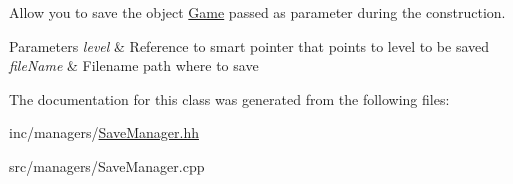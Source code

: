 Allow you to save the object \hyperlink{classGame}{Game} passed as parameter during the construction. 


\begin{DoxyParams}{Parameters}
{\em level} & Reference to smart pointer that points to level to be saved \\
\hline
{\em file\+Name} & Filename path where to save \\
\hline
\end{DoxyParams}


The documentation for this class was generated from the following files\+:\begin{DoxyCompactItemize}
\item 
inc/managers/\hyperlink{SaveManager_8hh}{Save\+Manager.\+hh}\item 
src/managers/Save\+Manager.\+cpp\end{DoxyCompactItemize}
